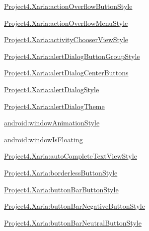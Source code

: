{\ttfamily \hyperlink{classproject4_1_1xaria_1_1R_1_1styleable_abb732edffcf1b36c734cb674eb0a4092}{Project4.\+Xaria\+:action\+Overflow\+Button\+Style}}

{\ttfamily \hyperlink{classproject4_1_1xaria_1_1R_1_1styleable_a51ca3492a0dc1ccc3966dd4a59665a62}{Project4.\+Xaria\+:action\+Overflow\+Menu\+Style}}

{\ttfamily \hyperlink{classproject4_1_1xaria_1_1R_1_1styleable_ad55044cb99752002455670fa3f2f4a28}{Project4.\+Xaria\+:activity\+Chooser\+View\+Style}}

{\ttfamily \hyperlink{classproject4_1_1xaria_1_1R_1_1styleable_acb4a414bfb83d9548273fc395f7089bd}{Project4.\+Xaria\+:alert\+Dialog\+Button\+Group\+Style}}

{\ttfamily \hyperlink{classproject4_1_1xaria_1_1R_1_1styleable_a5c8e6a4235c2c98dfbe58c9c3156e38a}{Project4.\+Xaria\+:alert\+Dialog\+Center\+Buttons}}

{\ttfamily \hyperlink{classproject4_1_1xaria_1_1R_1_1styleable_aad7f2a212de4bf58ca6cc476eab41d07}{Project4.\+Xaria\+:alert\+Dialog\+Style}}

{\ttfamily \hyperlink{classproject4_1_1xaria_1_1R_1_1styleable_a5721980038eb99ff7b34164c0824b0f6}{Project4.\+Xaria\+:alert\+Dialog\+Theme}}

{\ttfamily \hyperlink{classproject4_1_1xaria_1_1R_1_1styleable_a9cd010ea2199c7b2d3343acea12f21ce}{android\+:window\+Animation\+Style}}

{\ttfamily \hyperlink{classproject4_1_1xaria_1_1R_1_1styleable_a82f0023ac5cdc68430cb09e5f9ca2633}{android\+:window\+Is\+Floating}}

{\ttfamily \hyperlink{classproject4_1_1xaria_1_1R_1_1styleable_a7608aea43314e12bc4f420fc021aac72}{Project4.\+Xaria\+:auto\+Complete\+Text\+View\+Style}}

{\ttfamily \hyperlink{classproject4_1_1xaria_1_1R_1_1styleable_ae837237fac21a2cede4731aba76d2506}{Project4.\+Xaria\+:borderless\+Button\+Style}}

{\ttfamily \hyperlink{classproject4_1_1xaria_1_1R_1_1styleable_ae2759e35f58ee9b12ec64393bc516a42}{Project4.\+Xaria\+:button\+Bar\+Button\+Style}}

{\ttfamily \hyperlink{classproject4_1_1xaria_1_1R_1_1styleable_a88fbb3d960b1618f126b09fb5d07f435}{Project4.\+Xaria\+:button\+Bar\+Negative\+Button\+Style}}

{\ttfamily \hyperlink{classproject4_1_1xaria_1_1R_1_1styleable_ad75543e499457698c2fe0f0bd7349a82}{Project4.\+Xaria\+:button\+Bar\+Neutral\+Button\+Style}}

